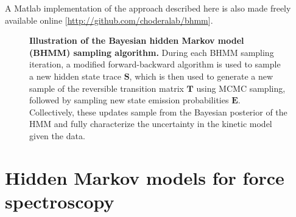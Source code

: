 \documentclass[aps,pre,twocolumn,superscriptaddress,nofootinbib,longbibliography]{revtex4-1}
\begin{document}
{{%
A Matlab implementation of the approach described here is also made freely available online [\url{http://github.com/choderalab/bhmm}].
}

\begin{figure}[tb]
\noindent
{}
\caption{{\bf Illustration of the Bayesian hidden Markov model (BHMM) sampling algorithm.}
During each BHMM sampling iteration, a modified forward-backward algorithm is used to sample a new hidden state trace $\mathbf{S}$, which is then used to generate a new sample of the reversible transition matrix $\mathbf{T}$ using MCMC sampling, followed by sampling new state emission probabilities $\mathbf{E}$.
Collectively, these updates sample from the Bayesian posterior of the HMM and fully characterize the uncertainty in the kinetic model given the data.
\label{figure:bhmm-workflow}}
\end{figure}


\section{Hidden Markov models for force spectroscopy}
\label{section:theory}

}
\end{document}
